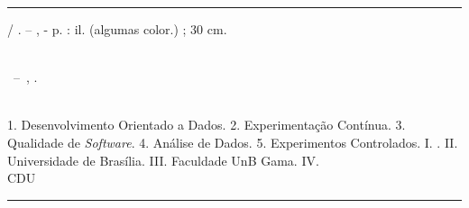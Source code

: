 \begin{fichacatalografica}
	\vspace*{\fill}					%
	\hrule							%
	\begin{center}					%
	\begin{minipage}[c]{12.5cm}		%
	
	\imprimirautor
	
	\hspace{0.5cm} \imprimirtitulo  / \imprimirautor. --
	\imprimirlocal, \imprimirdata-
	\hspace{0.5cm} \pageref{LastPage} p. : il. (algumas color.) ; 30 cm.\\
	\hspace{0.5cm} \imprimirorientadorRotulo~\imprimirorientador\\
	\hspace{0.5cm}
	\parbox[t]{\textwidth}{\imprimirtipotrabalho~--~\imprimirinstituicao,
	\imprimirdata.}\\
	\hspace{0.5cm}
		1. Desenvolvimento Orientado a Dados.
		2. Experimentação Contínua.
		3. Qualidade de \textit{Software}.
		4. Análise de Dados.
		5. Experimentos Controlados.
		I. \imprimirorientador.
		II. Universidade de Brasília.
		III. Faculdade UnB Gama.
		IV. \imprimirtitulo\\ 			
	
	\hspace{8.75cm} CDU \nomecdu\\
	
	\end{minipage}
	\end{center}
	\hrule
\end{fichacatalografica}
